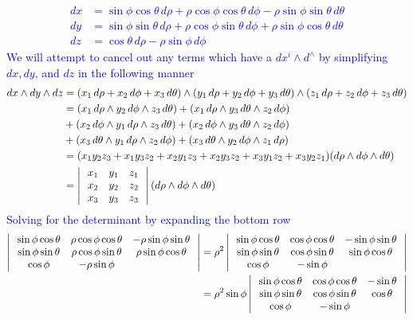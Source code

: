 \documentclass[10pt,a4paper]{report}
\newcommand{\BLUE}[1]{\textcolor{blue}{#1}}
\begin{document}
\begin{enumerate}[label=4.\arabic*]
\BLUE{\begin{align*}
	dx &= \sin\phi \cos \theta \,d\rho + \rho \cos \phi \cos \theta \,d\phi - \rho \sin\phi \sin \theta\,  d\theta \\
	dy &= \sin\phi\sin\theta\,d\rho + \rho\cos\phi\sin\theta\,d\phi + \rho\sin\phi\cos\theta\,d\theta \\
	dz &= \cos\theta\, d\rho-\rho\sin\phi\, d\phi
\end{align*}We will attempt to cancel out any terms which have a $dx^i\wedge d^\wedge$ by simplifying $dx, dy$, and $dz$ in the following manner
\begin{align*}
	dx \wedge dy \wedge dz &= (x_1\,d\rho + x_2\,d\phi+x_3\,d\theta)\wedge(y_1\,d\rho + y_2\,d\phi+y_3\,d\theta)\wedge(z_1\,d\rho + z_2\,d\phi+z_3\,d\theta) \\ 
	&= (x_1\,d\rho\wedge y_2\,d\phi\wedge z_3\,d\theta)+(x_1\,d\rho\wedge y_3\,d\theta\wedge z_2\,d\phi) \\
	&+ (x_2\,d\phi\wedge y_1\,d\rho \wedge z_3\,d\theta) + (x_2\,d\phi\wedge y_3\,d\theta\wedge z_2\,d\phi) \\
	&+ (x_3\,d\theta\wedge y_1\,d\rho \wedge z_2\,d\phi) + (x_3\,d\theta\wedge y_2\,d\phi\wedge z_1\,d\rho) \\
	&= (x_1y_2z_3+x_1y_3z_2 + x_2y_1z_3 + x_2y_3z_2 + x_3y_1z_2 + x_3y_2z_1)(d\rho\wedge d\phi\wedge d\theta) \\
	&= \left |\,  \begin{array}{c c c} x_1&y_1&z_1 \\ x_2 & y_2 & z_2 \\ x_3 & y_3 & z_3 \end{array}  \,\right |(d\rho\wedge d\phi\wedge d\theta)
\end{align*}Solving for the determinant by expanding the bottom row
\begin{align*}
	\DTHREEXTHREE{\sin\phi \cos \theta}{\rho \cos \phi \cos \theta }{- \rho \sin\phi \sin \theta}{\sin\phi\sin\theta}{ \rho\cos\phi\sin\theta} {\rho\sin\phi\cos\theta}{\cos\phi}{-\rho\sin\phi}{} &= \rho^2\DTHREEXTHREE{\sin\phi \cos \theta}{ \cos \phi \cos \theta }{-  \sin\phi \sin \theta}{\sin\phi\sin\theta}{\cos\phi\sin\theta} {\sin\phi\cos\theta}{\cos\phi}{-\sin\phi}{} \\
	&= \rho^2\sin\phi\DTHREEXTHREE{\sin\phi \cos \theta}{ \cos \phi \cos \theta }{- \sin \theta}{\sin\phi\sin\theta}{\cos\phi\sin\theta} {\cos\theta}{\cos\phi}{-\sin\phi}{}\\

\end{align*}}
\end{enumerate}
\end{document}
